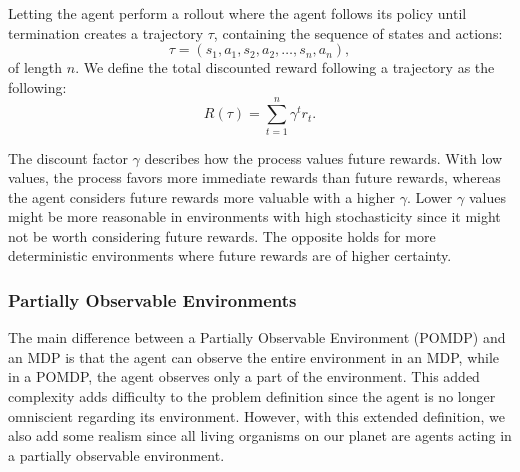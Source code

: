 \documentclass[12pt,A4]{report}
\theoremstyle{definition}
\begin{document}

Letting the agent perform a rollout where the agent follows its policy until termination creates a trajectory $\tau$, containing the sequence of states and actions:
\[ \tau = (s_1, a_1, s_2, a_2, \dots , s_n, a_n),\]
of length $n$. We define the total discounted reward following a trajectory as the following:
\[ R(\tau) = \sum_{t=1}^n \gamma^t r_t.\]

The discount factor $\gamma$ describes how the process values future rewards. With low values, the process favors more immediate rewards than future rewards, whereas the agent considers future rewards more valuable with a higher $\gamma$. Lower $\gamma$ values might be more reasonable in environments with high stochasticity since it might not be worth considering future rewards. The opposite holds for more deterministic environments where future rewards are of higher certainty.


\subsubsection{Partially Observable Environments}

The main difference between a Partially Observable Environment (POMDP) and an MDP is that the agent can observe the entire environment in an MDP, while in a POMDP, the agent observes only a part of the environment. This added complexity adds difficulty to the problem definition since the agent is no longer omniscient regarding its environment. However, with this extended definition, we also add some realism since all living organisms on our planet are agents acting in a partially observable environment.
\end{document}
